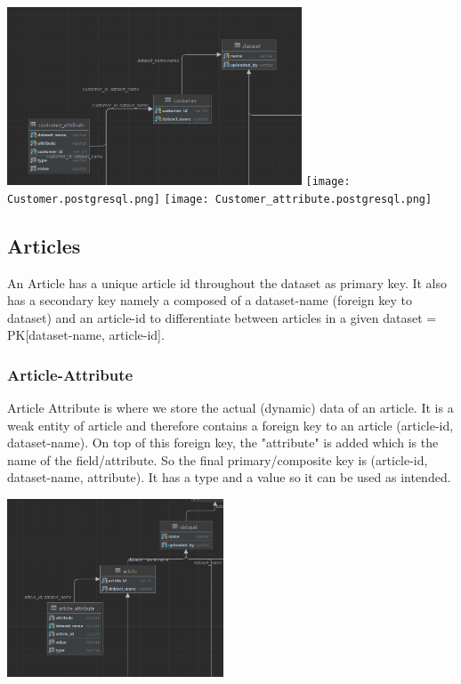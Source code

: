 \documentclass[a4paper,12pt]{article}
\begin{document}
	\begin{center}
		  		\includegraphics[height={200px},width=\textwidth,keepaspectratio]{Customer.png}
		  		\texttt{[image: Customer.postgresql.png]}
		  		\texttt{[image: Customer\_attribute.postgresql.png]}
	\end{center}
	\pagebreak
	\subsection{Articles}
		An Article has a unique article id throughout the dataset as primary key. It also has a secondary key namely a composed of a dataset-name (foreign key to dataset) and an article-id to differentiate between articles in a given dataset = PK[dataset-name, article-id].
		\subsubsection{Article-Attribute}
			Article Attribute is where we store the actual (dynamic) data of an article. It is a weak entity of article and therefore contains a foreign key to an article (article-id, dataset-name). On top of this foreign key, the "attribute" is added which is the name of the field/attribute. So the final primary/composite key is (article-id, dataset-name, attribute). It has a type and a value so it can be used as intended.
	\begin{center}
		  		\includegraphics[height={200px},width=\textwidth,keepaspectratio]{Article.png}
	\end{center}
	\pagebreak	
\end{document}
